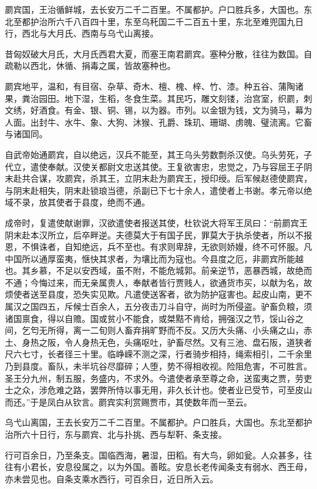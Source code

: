 \documentclass[]{article}
\begin{document}
罽宾国，王治循鲜城，去长安万二千二百里。不属都护。户口胜兵多，大国也。东北至都护治所六千八百四十里，东至乌秅国二千二百五十里，东北至难兜国九日行，西北与大月氏、西南与乌弋山离接。

昔匈奴破大月氏，大月氏西君大夏，而塞王南君罽宾。塞种分散，往往为数国。自疏勒以西北，休循、捐毒之属，皆故塞种也。

罽宾地平，温和，有目宿、杂草、奇木、檀、槐、梓、竹、漆。种五谷、蒲陶诸果，粪治园田。地下湿，生稻，冬食生菜。其民巧，雕文刻镂，治宫室，织罽，刺文绣，好酒食。有金、银、铜、锡，以为器。市列。以金银为钱，文为骑马，幕为人面。出封牛、水牛、象、大狗、沐猴、孔爵、珠玑、珊瑚、虏魄、璧流离。它畜与诸国同。

自武帝始通罽宾，自以绝远，汉兵不能至，其王乌头劳数剽杀汉使。乌头劳死，子代立，遣使奉献。汉使关都尉文忠送其使。王复欲害忠，忠觉之，乃与容屈王子阴末赴共合谋，攻罽宾，杀其王，立阴末赴为罽宾王，授印绶。后军候赵德使罽宾，与阴末赴相失，阴末赴锁琅当德，杀副已下七十余人，遣使者上书谢。孝元帝以绝域不录，放其使者于县度，绝而不通。

成帝时，复遣使献谢罪，汉欲遣使者报送其使，杜钦说大将军王凤曰：``前罽宾王阴末赴本汉所立，后卒畔逆。夫德莫大于有国子民，罪莫大于执杀使者，所以不报恩，不惧诛者，自知绝远，兵不至也。有求则卑辞，无欲则娇嫚，终不可怀服。凡中国所以通厚蛮夷，惬快其求者，为壤比而为寇也。今县度之厄，非罽宾所能越也。其乡慕，不足以安西域，虽不附，不能危城郭。前亲逆节，恶暴西城，故绝而不通；今悔过来，而无亲属贵人，奉献者皆行贾贱人，欲通货市买，以献为名，故烦使者送至县度，恐失实见欺。凡遣使送客者，欲为防护寇害也。起皮山南，更不属汉之国四五，斥候士百余人，五分夜击刀斗自守，尚时为所侵盗。驴畜负粮，须诸国禀食，得以自赡。国或贫小不能食，或桀黠不肯给，拥强汉之节，馁山谷之间，乞匄无所得，离一二旬则人畜弃捐旷野而不反。又历大头痛、小头痛之山，赤土、身热之阪，令人身热无色，头痛呕吐，驴畜尽然。又有三池、盘石阪，道狭者尺六七寸，长者径三十里。临峥嵘不测之深，行者骑步相持，绳索相引，二千余里乃到县度。畜队，未半坑谷尽靡碎；人堕，势不得相收视。险阻危害，不可胜言。圣王分九州，制五服，务盛内，不求外。今遣使者承至尊之命，送蛮夷之贾，劳吏士之众，涉危难之路，罢弊所恃以事无用，非久长计也。使者业已受节，可至皮山而还。''于是凤白从钦言。罽宾实利赏赐贾市，其使数年而一至云。

乌弋山离国，王去长安万二千二百里。不属都护。户口胜兵，大国也。东北至都护治所六十日行，东与罽宾、北与扑挑、西与犁靬、条支接。

行可百余日，乃至条支。国临西海，暑湿，田稻。有大鸟，卵如瓮。人众甚多，往往有小君长，安息役属之，以为外国。善眩。安息长老传闻条支有弱水、西王母，亦未尝见也。自条支乘水西行，可百余日，近日所入云。
\end{document}
